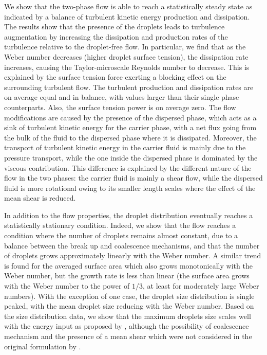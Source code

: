 We show that the two-phase flow is able to reach a statistically steady state as indicated by a balance of turbulent kinetic energy production and dissipation. The results show that the presence of the droplets leads to turbulence augmentation by increasing the dissipation and production rates of the turbulence relative to the droplet-free flow. In particular, we find that as the Weber number decreases (higher droplet surface tension), the dissipation rate increases, causing the Taylor-microscale Reynolds number to decrease. This is explained by the surface tension force exerting a blocking effect on the surrounding turbulent flow. The turbulent production and dissipation rates are on average equal and in balance, with values larger than their single phase counterparts. Also, the surface tension power is on average zero. The flow modifications are caused by the presence of the dispersed phase, which acts as a sink of turbulent kinetic energy for the carrier phase, with a net flux going from the bulk of the fluid to the dispersed phase where it is dissipated. Moreover, the transport of turbulent kinetic energy in the carrier fluid is mainly due to the pressure transport, while the one inside the dispersed phase is dominated by the viscous contribution. This difference is explained by the different nature of the flow in the two phases: the carrier fluid is mainly a shear flow, while the dispersed fluid is more rotational owing to its smaller length scales where the effect of the mean shear is reduced.

In addition to the flow properties, the droplet distribution eventually reaches a statistically stationary condition. Indeed, we show that the flow reaches a condition where the number of droplets remains almost constant, due to a balance between the break up and coalescence mechanisms, and that the number of droplets grows approximately linearly with the Weber number. A similar trend is found for the averaged surface area which also grows monotonically with the Weber number, but the growth rate is less than linear (the surface area grows with the Weber number to the power of $1/3$, at least for moderately large Weber numbers). With the exception of one case, the droplet size distribution is single peaked, with the mean droplet size reducing with the Weber number. Based on the size distribution data, we show that the maximum droplets size scales well with the energy input as proposed by \citet{hinze_1955a}, although the possibility of coalescence mechanism and the presence of a mean shear which were not considered in the original formulation by \citet{hinze_1955a}.


